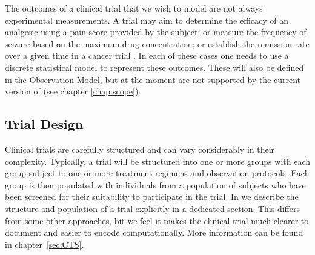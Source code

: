 The outcomes of a clinical trial that we wish to model are not always
experimental measurements. A trial may aim to determine the efficacy
of an analgesic using a pain score provided by the subject; or measure
the frequency of seizure based on the maximum drug concentration; or
establish the remission rate over a given time in a cancer trial
\cite{Bonate:2011fk}. In each of these cases one needs to use a
discrete statistical model to represent these outcomes. These will
also be defined in the Observation Model, but at the moment are not
supported by the current version of \pharmml (see chapter
\ref{chap:scope}).

\subsection{Trial Design}

Clinical trials are carefully structured and can vary considerably in
their complexity. Typically, a trial will be structured into one or
more groups with each group subject to one or more treatment regimens
and observation protocols. Each group is then populated with individuals
from a population of subjects who have been screened for their
suitability to participate in the trial. In \pharmml we describe
the structure and population of a trial
explicitly in a dedicated section. This differs from some other
approaches, bit we feel it makes the clinical trial much clearer to
document and easier to encode computationally. More information can be
found in chapter~\ref{sec:CTS}.


